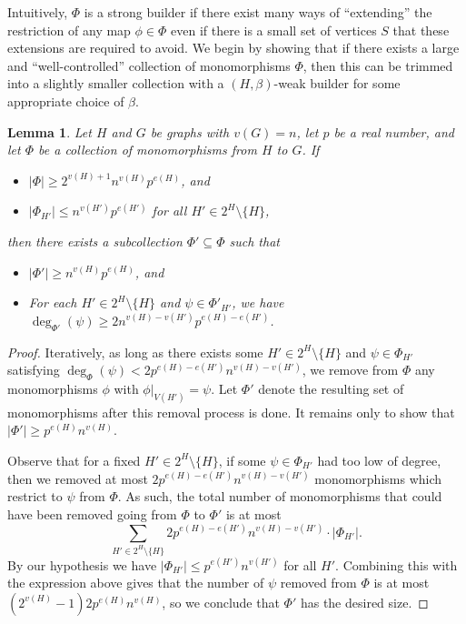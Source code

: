 \documentclass[12pt,letterpaper]{article}
\newtheorem{lemma}[theorem]{Lemma}
\theoremstyle{definition}
\newcommand{\sm}{\setminus}
\begin{document}
	Intuitively, $\Phi$ is a strong builder if there exist many ways of ``extending'' the restriction of any map $\phi\in \Phi$ even if there is a small set of vertices $S$ that these extensions are required to avoid.  We begin by showing that if there exists a large and ``well-controlled'' collection of monomorphisms $\Phi$, then this can be trimmed into a slightly smaller collection with a $(H,\beta)$-weak builder for some appropriate choice of $\beta$.  %
	
	
	\begin{lemma}\label{lemma weak builder}
		Let $H$ and $G$ be graphs with $v(G)=n$, let $p$ be a real number, and let $\Phi$ be a collection of monomorphisms from $H$ to $G$. If
		\begin{itemize}
			\item $|\Phi|\geq 2^{v(H)+1}n^{v(H)}p^{e(H)}$, and
			\item $|\Phi_{H'}|\leq n^{v(H')}p^{e(H')}$ for all $H'\in 2^H\setminus\{H\}$,
		\end{itemize}
		then there exists a subcollection $\Phi'\subseteq \Phi$ such that
		\begin{itemize}
			\item $|\Phi'|\geq n^{v(H)}p^{e(H)}$, and
			\item For each $H'\in 2^H\setminus\{H\}$ and $\psi\in\Phi'_{H'}$, we have $\deg_{\Phi'}(\psi)\geq 2n^{v(H)-v(H')}p^{e(H)-e(H')}$.
		\end{itemize}
	\end{lemma}
	\begin{proof}
		Iteratively, as long as there exists some $H'\in 2^H\setminus\{H\}$ and $\psi\in \Phi_{H'}$ satisfying $\deg_{\Phi}(\psi)<2p^{e(H)-e(H')}n^{v(H)-v(H')}$, we remove from $\Phi$ any monomorphisms $\phi$ with $\phi|_{V(H')}=\psi$. Let $\Phi'$ denote the resulting set of monomorphisms after this removal process is done.  It remains only to show that $|\Phi'|\ge p^{e(H)} n^{v(H)}$.
		
		Observe that for a fixed $H'\in 2^H\setminus\{H\}$, if some $\psi\in \Phi_{H'}$ had too low of degree, then we removed at most $2p^{e(H)-e(H')}n^{v(H)-v(H')}$ monomorphisms which restrict to $\psi$ from $\Phi$.  As such, the total number of monomorphisms that could have been removed going from $\Phi$ to $\Phi'$ is at most 
		\[
		\sum_{H'\in 2^H\sm \{H\}} 2p^{e(H)-e(H')}n^{v(H)-v(H')}\cdot |\Phi_{H'}|.
		\]
		By our hypothesis we have $|\Phi_{H'}|\le p^{e(H')} n^{v(H')}$ for all $H'$. Combining this with the expression above gives that the number of $\psi$ removed from $\Phi$ is at most $(2^{v(H)}-1)2p^{e(H)}n^{v(H)}$, so we conclude that $\Phi'$ has the desired size.
	\end{proof}
	
\end{document}
